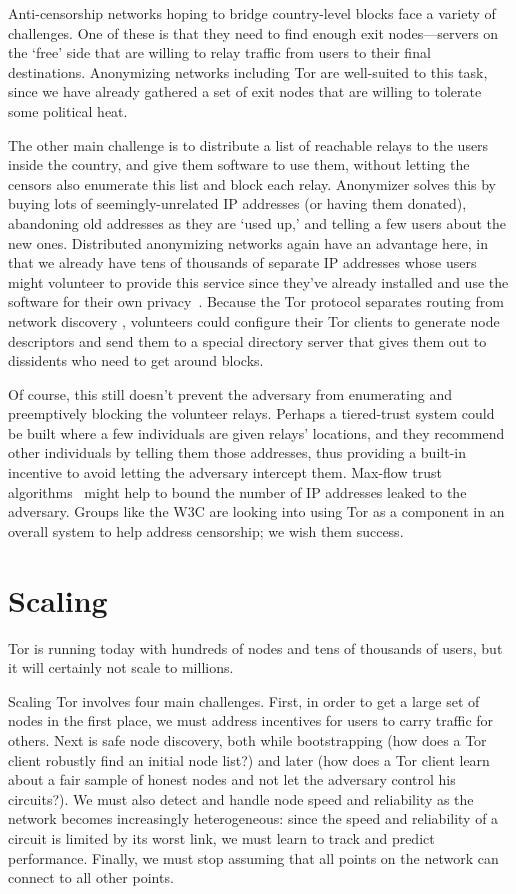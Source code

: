 \documentclass{llncs}
\begin{document}
Anti-censorship networks hoping to bridge country-level blocks face
a variety of challenges. One of these is that they need to find enough
exit nodes---servers on the `free' side that are willing to relay
traffic from users to their final destinations. Anonymizing
networks including Tor are well-suited to this task, since we have
already gathered a set of exit nodes that are willing to tolerate some
political heat.

The other main challenge is to distribute a list of reachable relays
to the users inside the country, and give them software to use them,
without letting the censors also enumerate this list and block each
relay. Anonymizer solves this by buying lots of seemingly-unrelated IP
addresses (or having them donated), abandoning old addresses as they are
`used up,' and telling a few users about the new ones. Distributed
anonymizing networks again have an advantage here, in that we already
have tens of thousands of separate IP addresses whose users might
volunteer to provide this service since they've already installed and use
the software for their own privacy~\cite{koepsell:wpes2004}. Because
the Tor protocol separates routing from network discovery \cite{tor-design},
volunteers could configure their Tor clients
to generate node descriptors and send them to a special directory
server that gives them out to dissidents who need to get around blocks.

Of course, this still doesn't prevent the adversary
from enumerating and preemptively blocking the volunteer relays.
Perhaps a tiered-trust system could be built where a few individuals are
given relays' locations, and they recommend other individuals by telling them
those addresses, thus providing a built-in incentive to avoid letting the
adversary intercept them. Max-flow trust algorithms~\cite{advogato}
might help to bound the number of IP addresses leaked to the adversary. Groups
like the W3C are looking into using Tor as a component in an overall system to
help address censorship; we wish them success.


\section{Scaling}
\label{sec:scaling}

Tor is running today with hundreds of nodes and tens of thousands of
users, but it will certainly not scale to millions.

Scaling Tor involves four main challenges. First, in order to get a
large set of nodes in the first place, we must address incentives for
users to carry traffic for others. Next is safe node discovery, both
while bootstrapping (how does a Tor client robustly find an initial
node list?) and later (how does a Tor client learn about a fair sample
of honest nodes and not let the adversary control his circuits?).
We must also detect and handle node speed and reliability as the network
becomes increasingly heterogeneous: since the speed and reliability
of a circuit is limited by its worst link, we must learn to track and
predict performance. Finally, we must stop assuming that all points on
the network can connect to all other points.
\end{document}
